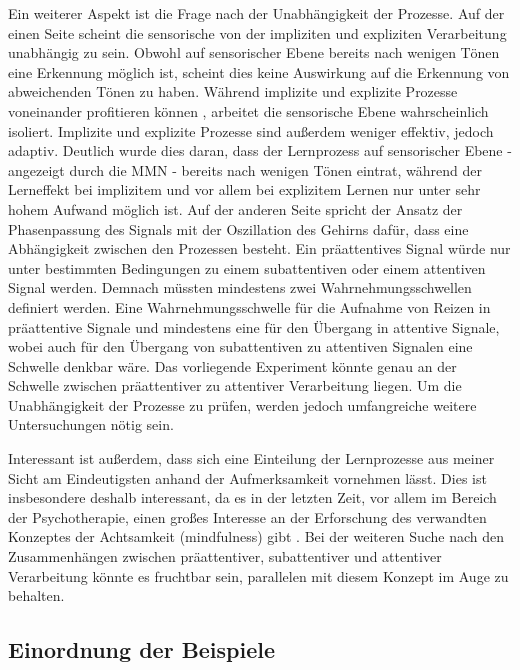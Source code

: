 \documentclass[doc,a4paper,12pt]{apa6}
\begin{document}
Ein weiterer Aspekt ist die Frage nach der Unabhängigkeit der Prozesse. Auf der einen Seite scheint die sensorische von der impliziten und expliziten Verarbeitung unabhängig zu sein. Obwohl auf sensorischer Ebene bereits nach wenigen Tönen eine Erkennung möglich ist, scheint dies keine Auswirkung auf die Erkennung von abweichenden Tönen zu haben. Während implizite und explizite Prozesse voneinander profitieren können \parencite{sun2005interaction}, arbeitet die sensorische Ebene wahrscheinlich isoliert. Implizite und explizite Prozesse sind außerdem weniger effektiv, jedoch adaptiv. Deutlich wurde dies daran, dass der Lernprozess auf sensorischer Ebene - angezeigt durch die MMN - bereits nach wenigen Tönen eintrat, während der Lerneffekt bei implizitem und vor allem bei explizitem Lernen nur unter sehr hohem Aufwand möglich ist. Auf der anderen Seite spricht der Ansatz der Phasenpassung des Signals mit der Oszillation des Gehirns dafür, dass eine Abhängigkeit zwischen den Prozessen besteht. Ein präattentives Signal würde nur unter bestimmten Bedingungen zu einem subattentiven oder einem attentiven Signal werden. Demnach müssten mindestens zwei Wahrnehmungsschwellen definiert werden. Eine Wahrnehmungsschwelle für die Aufnahme von Reizen in präattentive Signale und mindestens eine für den Übergang in attentive Signale, wobei auch für den Übergang von subattentiven zu attentiven Signalen eine Schwelle denkbar wäre. Das vorliegende Experiment könnte genau an der Schwelle zwischen präattentiver zu attentiver Verarbeitung liegen. Um die Unabhängigkeit der Prozesse zu prüfen, werden jedoch umfangreiche weitere Untersuchungen nötig sein.

Interessant ist außerdem, dass sich eine Einteilung der Lernprozesse aus meiner Sicht am Eindeutigsten anhand der Aufmerksamkeit vornehmen lässt. Dies ist insbesondere deshalb interessant, da es in der letzten Zeit, vor allem im Bereich der Psychotherapie, einen großes Interesse an der Erforschung des verwandten Konzeptes der Achtsamkeit (mindfulness) gibt \parencite[vgl.][]{bishop2004mindfulness,khoury2013mindfulness}. Bei der weiteren Suche nach den Zusammenhängen zwischen präattentiver, subattentiver und attentiver Verarbeitung könnte es fruchtbar sein, parallelen mit diesem Konzept im Auge zu behalten.

\subsection{Einordnung der Beispiele}
\end{document}
